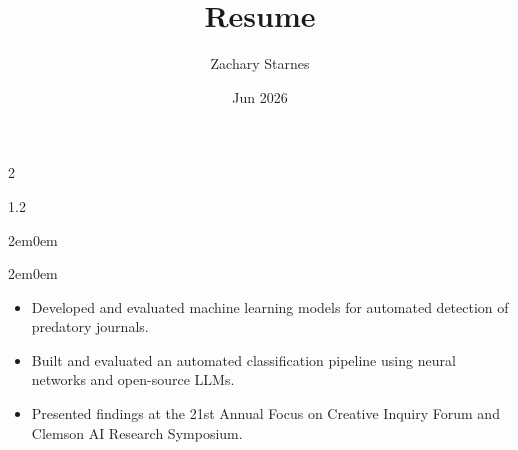 \documentclass{my_cv}
\title{Resume}
\author{Zachary Starnes}
\date{Jun 2026}
\begin{document}
\begin{multicols}{2}

    \columnbreak
    \raggedleft
    \begin{spacing}{1.2}
        \large{}
    \end{spacing}
\end{multicols}

\begin{adjustwidth}{2em}{0em}

\end{adjustwidth}

\setlength{\columnsep}{1cm}

\begin{adjustwidth}{2em}{0em}


\begin{itemize}
    \item Developed and evaluated machine learning models for automated detection of predatory journals.
    \item Built and evaluated an automated classification pipeline using neural networks and open-source LLMs.
    \item Presented findings at the 21st Annual Focus on Creative Inquiry Forum and Clemson AI Research Symposium.
\end{itemize}


\end{adjustwidth}
\end{document}
